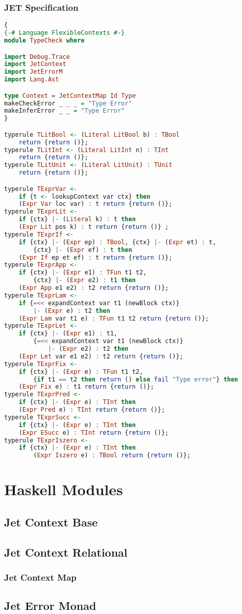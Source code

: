 \subsection{JET Specification}
\begin{lstlisting}[escapechar=\$, language=Haskell]
{
{-# Language FlexibleContexts #-}
module TypeCheck where

import Debug.Trace
import JetContext
import JetErrorM
import Lang.Ast

type Context = JetContextMap Id Type
makeCheckError _ _ _ = "Type Error"
makeInferError _ _ = "Type Error"
}

typerule TLitBool <- (Literal LitBool b) : TBool 
    return {return ()};
typerule TLitInt <- (Literal LitInt n) : TInt 
    return {return ()};
typerule TLitUnit <- (Literal LitUnit) : TUnit 
    return {return ()};

typerule TExprVar <- 
    if {t <- lookupContext var ctx} then 
    (Expr Var loc var) : t return {return ()};
typerule TExprLit <- 
    if {ctx} |- (Literal k) : t then 
    (Expr Lit pos k) : t return {return ()} ;
typerule TExprIf <- 
    if {ctx} |- (Expr ep) : TBool, {ctx} |- (Expr et) : t, 
        {ctx} |- (Expr ef) : t then 
    (Expr If ep et ef) : t return {return ()};
typerule TExprApp <- 
    if {ctx} |- (Expr e1) : TFun t1 t2, 
        {ctx} |- (Expr e2) : t1 then 
    (Expr App e1 e2) : t2 return {return ()};
typerule TExprLam <- 
    if {=<< expandContext var t1 (newBlock ctx)} 
        |- (Expr e) : t2 then 
    (Expr Lam var t1 e) : TFun t1 t2 return {return ()};
typerule TExprLet <- 
    if {ctx} |- (Expr e1) : t1, 
        {=<< expandContext var t1 (newBlock ctx)} 
            |- (Expr e2) : t2 then 
    (Expr Let var e1 e2) : t2 return {return ()};
typerule TExprFix <- 
    if {ctx} |- (Expr e) : TFun t1 t2, 
        {if t1 == t2 then return () else fail "Type error"} then 
    (Expr Fix e) : t1 return {return ()};
typerule TExprPred <- 
    if {ctx} |- (Expr e) : TInt then 
    (Expr Pred e) : TInt return {return ()};
typerule TExprSucc <- 
    if {ctx} |- (Expr e) : TInt then 
    (Expr ESucc e) : TInt return {return ()};
typerule TExprIszero <- 
    if {ctx} |- (Expr e) : TInt then 
        (Expr Iszero e) : TBool return {return ()};
\end{lstlisting}

\chapter{Haskell Modules}
\section{Jet Context Base}
\section{Jet Context Relational}
\subsection{Jet Context Map}
\section{Jet Error Monad}